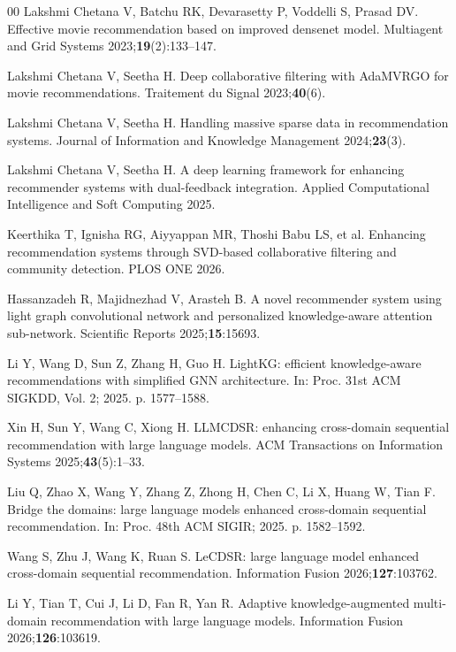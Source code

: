 \documentclass[3p,times,procedia]{elsarticle}
\begin{document}
\begin{thebibliography}{00}
Lakshmi Chetana V, Batchu RK, Devarasetty P, Voddelli S, Prasad DV. Effective movie recommendation based on improved densenet model. Multiagent and Grid Systems 2023;\textbf{19}(2):133--147.

Lakshmi Chetana V, Seetha H. Deep collaborative filtering with AdaMVRGO for movie recommendations. Traitement du Signal 2023;\textbf{40}(6).

Lakshmi Chetana V, Seetha H. Handling massive sparse data in recommendation systems. Journal of Information and Knowledge Management 2024;\textbf{23}(3).

Lakshmi Chetana V, Seetha H. A deep learning framework for enhancing recommender systems with dual-feedback integration. Applied Computational Intelligence and Soft Computing 2025.

Keerthika T, Ignisha RG, Aiyyappan MR, Thoshi Babu LS, et al. Enhancing recommendation systems through SVD-based collaborative filtering and community detection. PLOS ONE 2026.

Hassanzadeh R, Majidnezhad V, Arasteh B. A novel recommender system using light graph convolutional network and personalized knowledge-aware attention sub-network. Scientific Reports 2025;\textbf{15}:15693.

Li Y, Wang D, Sun Z, Zhang H, Guo H. LightKG: efficient knowledge-aware recommendations with simplified GNN architecture. In: Proc. 31st ACM SIGKDD, Vol. 2; 2025. p. 1577--1588.

Xin H, Sun Y, Wang C, Xiong H. LLMCDSR: enhancing cross-domain sequential recommendation with large language models. ACM Transactions on Information Systems 2025;\textbf{43}(5):1--33.

Liu Q, Zhao X, Wang Y, Zhang Z, Zhong H, Chen C, Li X, Huang W, Tian F. Bridge the domains: large language models enhanced cross-domain sequential recommendation. In: Proc. 48th ACM SIGIR; 2025. p. 1582--1592.

Wang S, Zhu J, Wang K, Ruan S. LeCDSR: large language model enhanced cross-domain sequential recommendation. Information Fusion 2026;\textbf{127}:103762.

Li Y, Tian T, Cui J, Li D, Fan R, Yan R. Adaptive knowledge-augmented multi-domain recommendation with large language models. Information Fusion 2026;\textbf{126}:103619.


\end{thebibliography}
\end{document}
